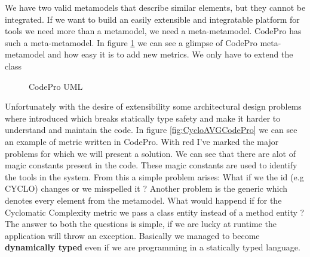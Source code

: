 	We have two valid metamodels that describe similar elements, but they cannot be
integrated. If we want to build an easily extensible and integratable platform
for tools we need more than a metamodel, we need a meta-metamodel. CodePro has
such a meta-metamodel. In figure \ref{fig:codeProUml} we can see a glimpse of
CodePro meta-metamodel and how easy it is to add new metrics. We only have to
extend the   class
	
\begin{figure}
\centering
{}
\caption{CodePro UML}
\label{fig:codeProUml}
\end{figure}

	Unfortunately with the desire of extensibility some architectural design
problems where introduced which breaks statically type safety and make it harder
to understand and maintain the code. In figure \ref{fig:CycloAVGCodePro} we
can see an example of metric written in CodePro. With red I've marked the major
problems for which we will present a solution. We can see that there are alot of
magic constants present in the code. These magic constants are used to identify
the tools in the system. From this a simple problem arises: What if we the id
(e.g CYCLO) changes or we misspelled it ? Another problem is the generic
 which denotes every element from the metamodel.
What would happend if for the Cyclomatic Complexity metric we pass a class
entity instead of a method entity ? The answer to both the questions is simple,
if we are lucky at runtime the application will throw an exception. Basically we
managed to become \textbf{dynamically typed} even if we are programming in a
statically typed language.


